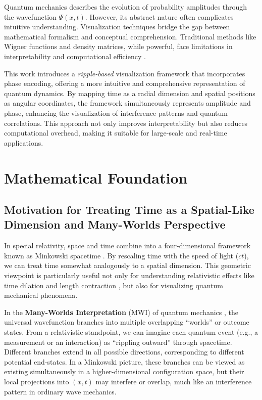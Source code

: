 \documentclass{article}
\begin{document}
Quantum mechanics describes the evolution of probability amplitudes through the wavefunction \(\Psi(x,t)\). However, its abstract nature often complicates intuitive understanding. Visualization techniques bridge the gap between mathematical formalism and conceptual comprehension. Traditional methods like Wigner functions and density matrices, while powerful, face limitations in interpretability and computational efficiency \cite{wigner1932,vonNeumann1932}.

This work introduces a \emph{ripple-based} visualization framework that incorporates phase encoding, offering a more intuitive and comprehensive representation of quantum dynamics. By mapping time as a radial dimension and spatial positions as angular coordinates, the framework simultaneously represents amplitude and phase, enhancing the visualization of interference patterns and quantum correlations. This approach not only improves interpretability but also reduces computational overhead, making it suitable for large-scale and real-time applications.

\section{Mathematical Foundation}
\label{sec:mathematical_foundation}

\subsection{Motivation for Treating Time as a Spatial-Like Dimension and Many-Worlds Perspective}

In special relativity, space and time combine into a four-dimensional framework known as Minkowski spacetime \cite{minkowski1908space, einstein1905}. By rescaling time with the speed of light (\(ct\)), we can treat time somewhat analogously to a spatial dimension. This geometric viewpoint is particularly useful not only for understanding relativistic effects like time dilation and length contraction \cite{rindler1977essential}, but also for visualizing quantum mechanical phenomena. 

In the \textbf{Many-Worlds Interpretation} (MWI) of quantum mechanics \cite{everett1957, dewitt1971}, the universal wavefunction branches into multiple overlapping “worlds” or outcome states. From a relativistic standpoint, we can imagine each quantum event (e.g., a measurement or an interaction) as “rippling outward” through spacetime. Different branches extend in all possible directions, corresponding to different potential end-states. In a Minkowski picture, these branches can be viewed as existing simultaneously in a higher-dimensional configuration space, but their local projections into \((x, t)\) may interfere or overlap, much like an interference pattern in ordinary wave mechanics.
\end{document}
